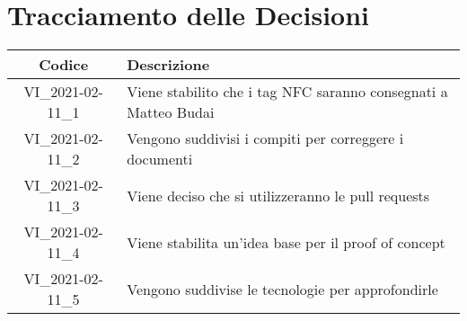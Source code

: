 \section*{Tracciamento delle Decisioni}

\begin{center}
	\begin{longtable}{|c|p{13cm}|}
	\hline
	\rowcolor{lighter-grayer}
	\textbf{Codice} & \textbf{Descrizione} \\
	\hline
	\endfirsthead

	\hline
	VI\_2021-02-11\_1 & Viene stabilito che i tag NFC saranno consegnati a Matteo Budai \\
	\hline
	VI\_2021-02-11\_2 & Vengono suddivisi i compiti per correggere i documenti \\
	\hline
	VI\_2021-02-11\_3 & Viene deciso che si utilizzeranno le pull requests \\
	\hline
	VI\_2021-02-11\_4 & Viene stabilita un'idea base per il proof of concept \\
	\hline
	VI\_2021-02-11\_5 & Vengono suddivise le tecnologie per approfondirle \\
	\hline
	

	\end{longtable}
\end{center}